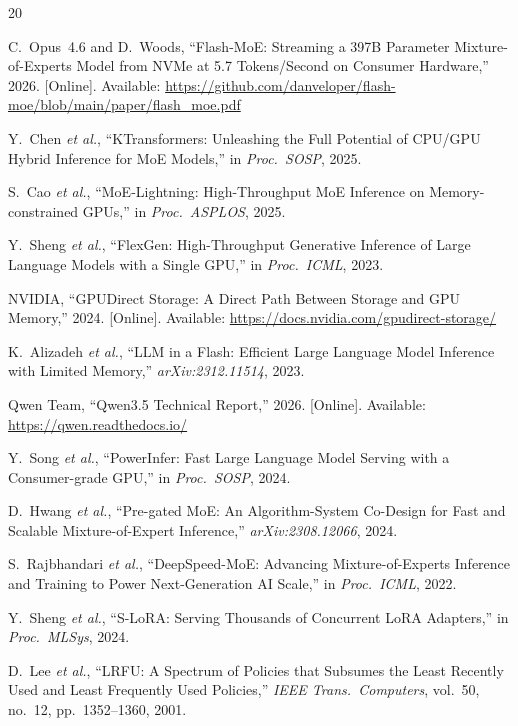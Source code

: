 \documentclass[11pt]{article}
\begin{document}
\begin{thebibliography}{20}

C.~Opus~4.6 and D.~Woods, ``Flash-MoE: Streaming a 397B Parameter Mixture-of-Experts Model from NVMe at 5.7 Tokens/Second on Consumer Hardware,'' 2026. [Online]. Available: \url{https://github.com/danveloper/flash-moe/blob/main/paper/flash_moe.pdf}

Y.~Chen \emph{et al.}, ``KTransformers: Unleashing the Full Potential of CPU/GPU Hybrid Inference for MoE Models,'' in \emph{Proc.\ SOSP}, 2025.

S.~Cao \emph{et al.}, ``MoE-Lightning: High-Throughput MoE Inference on Memory-constrained GPUs,'' in \emph{Proc.\ ASPLOS}, 2025.

Y.~Sheng \emph{et al.}, ``FlexGen: High-Throughput Generative Inference of Large Language Models with a Single GPU,'' in \emph{Proc.\ ICML}, 2023.

NVIDIA, ``GPUDirect Storage: A Direct Path Between Storage and GPU Memory,'' 2024. [Online]. Available: \url{https://docs.nvidia.com/gpudirect-storage/}

K.~Alizadeh \emph{et al.}, ``LLM in a Flash: Efficient Large Language Model Inference with Limited Memory,'' \emph{arXiv:2312.11514}, 2023.

Qwen Team, ``Qwen3.5 Technical Report,'' 2026. [Online]. Available: \url{https://qwen.readthedocs.io/}

Y.~Song \emph{et al.}, ``PowerInfer: Fast Large Language Model Serving with a Consumer-grade GPU,'' in \emph{Proc.\ SOSP}, 2024.

D.~Hwang \emph{et al.}, ``Pre-gated MoE: An Algorithm-System Co-Design for Fast and Scalable Mixture-of-Expert Inference,'' \emph{arXiv:2308.12066}, 2024.

S.~Rajbhandari \emph{et al.}, ``DeepSpeed-MoE: Advancing Mixture-of-Experts Inference and Training to Power Next-Generation AI Scale,'' in \emph{Proc.\ ICML}, 2022.

Y.~Sheng \emph{et al.}, ``S-LoRA: Serving Thousands of Concurrent LoRA Adapters,'' in \emph{Proc.\ MLSys}, 2024.

D.~Lee \emph{et al.}, ``LRFU: A Spectrum of Policies that Subsumes the Least Recently Used and Least Frequently Used Policies,'' \emph{IEEE Trans.\ Computers}, vol.~50, no.~12, pp.~1352--1360, 2001.


\end{thebibliography}
\end{document}
